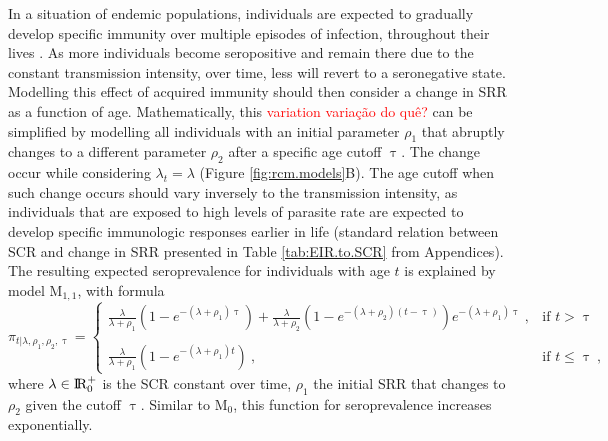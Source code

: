 In a situation of endemic populations, individuals are expected to gradually develop specific immunity over multiple episodes of infection, throughout their lives \cite{perlmann2002malaria}.
As more individuals become seropositive and remain there due to the constant transmission intensity, over time, less will revert to a seronegative state.
Modelling this effect of acquired immunity should then consider a change in SRR as a function of age.
Mathematically, this \textcolor{red}{variation variação do quê?} can be simplified by modelling all individuals with an initial parameter $\rho_1$ that abruptly changes to a different parameter $\rho_2$ after a specific age cutoff $\uptau$.
The change occur while considering $\lambda_t=\lambda$ (Figure \ref{fig:rcm.models}B).
The age cutoff when such change occurs should vary inversely to the transmission intensity, as individuals that are exposed to high levels of parasite rate are expected to develop specific immunologic responses earlier in life (standard relation between SCR and change in SRR presented in Table \ref{tab:EIR.to.SCR} from Appendices).
The resulting expected seroprevalence for individuals with age $t$ is explained by model M$_{1,1}$, with formula
%
\begin{equation}
    \label{eq:rcm.reduction.srr}
    \pi_{t | \lambda, \rho_1, \rho_2, \uptau} = \left\{\begin{array}{ll} \frac{\lambda}{\lambda+\rho_{1}}\left(1-e^{-(\lambda+\rho_{1})\uptau}\right)+\frac{\lambda}{\lambda+\rho_{2}}\left(1-e^{-(\lambda+\rho_{2})(t-\uptau)}\right)e^{-(\lambda+\rho_{1})\uptau}\ , & \text{if $t>\uptau$}\\\\  
    \frac{\lambda}{\lambda+\rho_{1}}\left(1-e^{-(\lambda+\rho_{1})t}\right)\ , & \text{if $t\le\uptau$}\ ,\end{array} \right.
\end{equation}
%
\noindent
where $\lambda \in \rm I\!R_{0}^{+}$ is the SCR constant over time, $\rho_1$ the initial SRR that changes to $\rho_2$ given the cutoff $\uptau$.
Similar to M$_{0}$, this function for seroprevalence increases exponentially.

